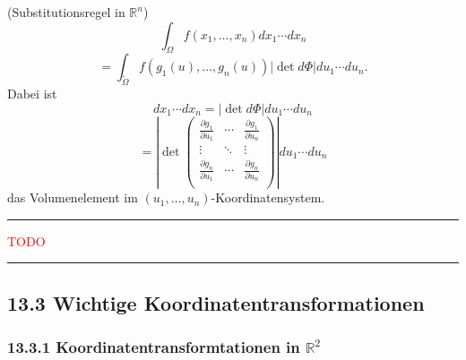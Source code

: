 \documentclass[a4paper,landscape,8pt]{extarticle}
\newcommand{\R}{\mathbb{R}}
\newcommand{\abs}[1]{\left\lvert #1 \right\rvert}
\newcommand{\todo}{\textcolor{red}{TODO }}
\newcommand{\sep}{\vspace{5pt}\noindent\hrule\vspace{5pt}}
\begin{document}
\begin{multicols*}{4}
\Satz (Substitutionsregel in $\R^n$)
\[
\int_\Omega f(x_1,\ldots,x_n) dx_1 \cdots dx_n
\]
\[=
\int_{\widetilde{\Omega}} f(g_1(u),\ldots,g_n(u)) \abs{\det{d\Phi}} du_1 \cdots
du_n.
\]
Dabei ist
\[
dx_1 \cdots dx_n = \abs{\det{d\Phi}} du_1 \cdots
du_n
\]
\[=
\abs{\det\begin{pmatrix}
\frac{\partial g_1}{\partial u_1} & \cdots & \frac{\partial g_1}{\partial u_n}\\
\vdots & \ddots & \vdots\\
\frac{\partial g_n}{\partial u_1} & \cdots & \frac{\partial g_n}{\partial u_n}\\
\end{pmatrix}}
 du_1 \cdots du_n
\]
das Volumenelement im $(u_1,\ldots,u_n)$-Koordinatensystem.

\begin{warmup}
\sep

\Bsp \todo

\sep
\end{warmup}

\subsection{13.3 Wichtige Koordinatentransformationen}

\subsubsection{13.3.1 Koordinatentransformtationen in $\R^2$}





\end{multicols*}
\end{document}
